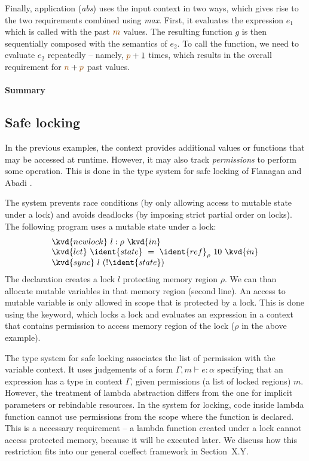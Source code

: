 Finally, application (\emph{abs}) uses the input context in two ways, which gives rise to the
two requirements combined using \emph{max}. First, it evaluates the expression $e_1$ which is 
called with the past $\aclrd{m}$ values. The resulting function $g$ is then sequentially composed
with the semantics of $e_2$. To call the function, we need to evaluate $e_2$ repeatedly -- namely,
$\aclrd{p}+1$ times, which results in the overall requirement for $\aclrd{n}+\aclrd{p}$ past values.

\paragraph{Summary}



\subsection{Safe locking}
In the previous examples, the context provides additional values or functions that may be accessed
at runtime. However, it may also track \emph{permissions} to perform some operation. This is done
in the type system for safe locking of Flanagan and Abadi \cite{app-safe-locking}.

The system prevents race conditions (by only allowing access to mutable state under a lock)
and avoids deadlocks (by imposing strict partial order on locks). The following 
program uses a mutable state under a lock:
%
\begin{equation*}
\begin{array}{l}
\kvd{newlock}~l:\rho~\kvd{in}\\
\kvd{let}~\ident{state}~=~\ident{ref}_\rho~10~\kvd{in}\\
\kvd{sync}~l~(!\ident{state})
\end{array}
\end{equation*}
%
The declaration  creates a lock $l$ protecting memory region $\rho$. We can than
allocate mutable variables in that memory region (second line). An access to mutable variable
is only allowed in scope that is protected by a lock. This is done using the  keyword,
which locks a lock and evaluates an expression in a context that contains permission to access
memory region of the lock ($\rho$ in the above example).

The type system for safe locking associates the list of permission with the variable context.
It uses judgements of a form $\Gamma, m \vdash e : \alpha$ specifying that an expression has a
type in context $\Gamma$, given permissions (a list of locked regions) $m$. However, the treatment
of lambda abstraction differs from the one for implicit parameters or rebindable resources.
In the system for locking, code inside lambda function cannot use permissions from the scope
where the function is declared. This is a necessary requirement -- a lambda function created 
under a lock cannot access protected memory, because it will be executed later. We discuss how
this restriction fits into our general coeffect framework in Section~X.Y.

